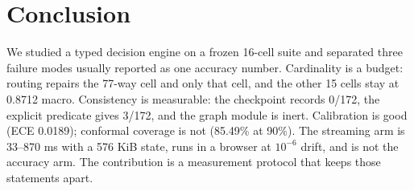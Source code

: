 \section{Conclusion}
\label{sec:conclusion}

We studied a typed decision engine on a frozen 16-cell suite and separated three failure modes usually reported as one accuracy number. Cardinality is a budget: routing repairs the 77-way cell and only that cell, and the other 15 cells stay at 0.8712 macro. Consistency is measurable: the checkpoint records 0/172, the explicit predicate gives 3/172, and the graph module is inert. Calibration is good (ECE 0.0189); conformal coverage is not (85.49\% at 90\%). The streaming arm is 33--870 ms with a 576 KiB state, runs in a browser at $10^{-6}$ drift, and is not the accuracy arm. The contribution is a measurement protocol that keeps those statements apart.
